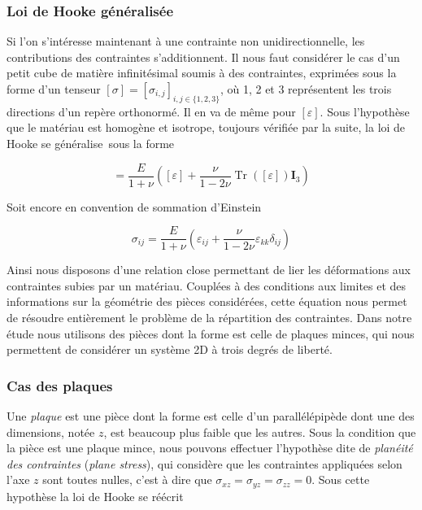 \subsubsection{Loi de Hooke généralisée}

Si l'on s'intéresse maintenant à une contrainte non unidirectionnelle, les contributions des contraintes s'additionnent. Il nous faut considérer le cas d'un petit cube de matière infinitésimal soumis à des contraintes, exprimées sous la forme d'un tenseur $[\sigma] = [\sigma_{i,j}]_{i,j\in\{1,2,3\}}$, où 1, 2 et 3 représentent les trois directions d'un repère orthonormé. Il en va de même pour $[\varepsilon]$. Sous l'hypothèse que le matériau est homogène et isotrope, toujours vérifiée par la suite, la loi de Hooke se généralise\,\cite{feynman_feynman_1963} sous la forme

\begin{equation}
[\sigma] = \frac{E}{1+\nu }\left( [\varepsilon] +\frac{\nu }{1-2\nu }\operatorname{Tr}\left( [\varepsilon] \right) \mathbf I_3 \right) 
\end{equation}

Soit encore en convention de sommation d'Einstein

\begin{equation}
\sigma_{ij} = \frac{E}{1+\nu } \left( \varepsilon_{ij}+\frac{\nu }{1-2\nu }\varepsilon_{kk} \delta _{ij}\right)
\end{equation}


Ainsi nous disposons d'une relation close permettant de lier les déformations aux contraintes subies par un matériau. Couplées à des conditions aux limites et des informations sur la géométrie des pièces considérées, cette équation nous permet de résoudre entièrement le problème de la répartition des contraintes. Dans notre étude nous utilisons des pièces dont la forme est celle de plaques minces, qui nous permettent de considérer un système 2D à trois degrés de liberté.


\subsubsection{Cas des plaques}

Une \textit{plaque} est une pièce dont la forme est celle d'un parallélépipède dont une des dimensions, notée $z$, est beaucoup plus faible que les autres. Sous la condition que la pièce est une plaque mince, nous pouvons effectuer l'hypothèse dite de \textit{planéité des contraintes} (\textit{plane stress}), qui considère que les contraintes appliquées selon l'axe $z$ sont toutes nulles, c'est à dire que $\sigma_{xz}=\sigma_{yz}=\sigma_{zz}=0$. Sous cette hypothèse la loi de Hooke se réécrit\,\cite{freund_dynamic_1990}


